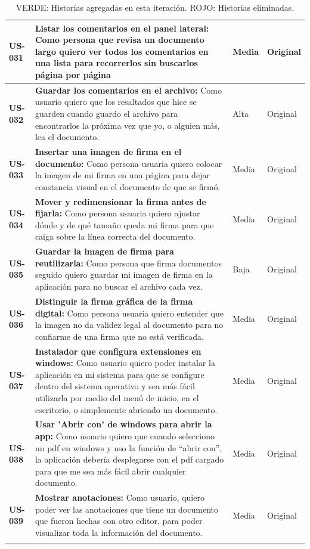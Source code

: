 \begin{longtable}{|l||p{7cm}|l|l|}
\textbf{US-031} & 
\textbf{Listar los comentarios en el panel lateral:} Como persona que revisa un documento largo quiero ver todos los comentarios en una lista para recorrerlos sin buscarlos página por página & Media & Original\\
\hline

\textbf{US-032} & 
\textbf{Guardar los comentarios en el archivo:} Como usuario quiero que los resaltados que hice se guarden cuando guardo el archivo para encontrarlos la próxima vez que yo, o alguien más, lea el documento. & Alta & Original\\
\hline

\textbf{US-033} & 
\textbf{Insertar una imagen de firma en el documento:} Como persona usuaria quiero colocar la imagen de mi firma en una página para dejar constancia visual en el documento de que se firmó. & Media & Original\\
\hline

\textbf{US-034} & 
\textbf{Mover y redimensionar la firma antes de fijarla:} Como persona usuaria quiero ajustar dónde y de qué tamaño queda mi firma para que caiga sobre la línea correcta del documento. & Media & Original\\
\hline

\textbf{US-035} & 
\textbf{Guardar la imagen de firma para reutilizarla:} Como persona que firma documentos seguido quiero guardar mi imagen de firma en la aplicación para no buscar el archivo cada vez. & Baja & Original\\
\hline

\textbf{US-036} & 
\textbf{Distinguir la firma gráfica de la firma digital:} Como persona usuaria quiero entender que la imagen no da validez legal al documento para no confiarme de una firma que no está verificada. & Media & Original\\
\hline

\textbf{US-037} & 
\textbf{Instalador que configura extensiones en windows:} Como usuario quiero poder instalar la aplicación en mi sistema para que se configure dentro del sistema operativo y sea más fácil utilizarla por medio del menú de inicio, en el escritorio, o simplemente abriendo un documento. & Media & Original\\
\hline

\textbf{US-038} & 
\textbf{Usar 'Abrir con' de windows para abrir la app:} Como usuario quiero que cuando selecciono un pdf en windows y uso la función de “abrir con”, la aplicación debería desplegarse con el pdf cargado para que me sea más fácil abrir cualquier documento. & Media & Original\\
\hline

\textbf{US-039} & 
\textbf{Mostrar anotaciones:} Como usuario, quiero poder ver las anotaciones que tiene un documento que fueron hechas con otro editor, para poder visualizar toda la información del documento. & Media & Original\\
\hline


\caption{\color{ForestGreen}VERDE: Historias agregadas en esta iteración. \color{Mahogany}ROJO: Historias eliminadas.}
\label{ProductBacklog}

\end{longtable}

